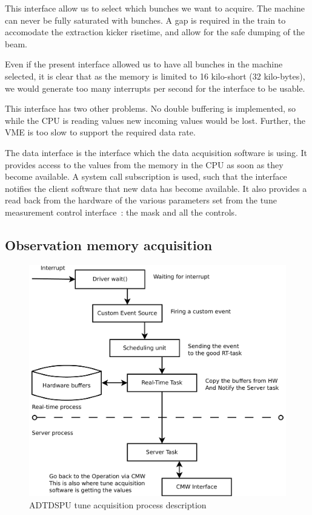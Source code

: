 This interface allow us to select which bunches we want to acquire. The machine can never be fully saturated with bunches. A gap is required in the train to accomodate the extraction kicker risetime, and allow for the safe dumping of the beam.

Even if the present interface allowed us to have all bunches in the machine selected, it is clear that as the memory is limited to 16 kilo-short (32 kilo-bytes), we would generate too many interrupts per second for the interface to be usable.

This interface has two other problems. No double buffering is implemented, so while the \gls{CPU} is reading values new incoming values would be lost. Further, the \gls{VME} is too slow to support the required data rate.

The data interface is the interface which the data acquisition software is using. It provides access to the values from the memory in the \gls{CPU} as soon as they become available. A system call subscription is used, such that the interface notifies the client software that new data has become available. It also provides a read back from the hardware of the various parameters set from the tune measurement control interface~: the mask and all the controls.

\subsection{Observation memory acquisition}
\label{sec:obs_mem_acq}

\begin{figure}[H]
\caption{ADTDSPU tune acquisition process description}
\centering
\includegraphics[scale=0.3]{adtdspu_acq.pdf}
\end{figure}

